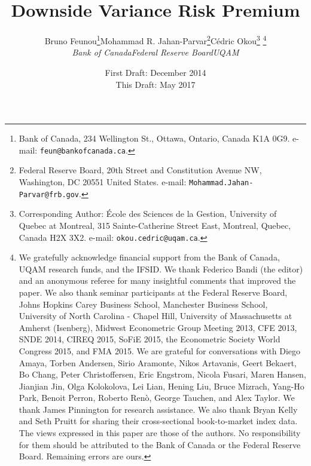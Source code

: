 \documentclass[11pt]{article}
\begin{document}
\title{Downside Variance Risk Premium}
\author{\begin{tabular}{ccc}
  Bruno Feunou\thanks{Bank of Canada, 234 Wellington St., Ottawa, Ontario, Canada K1A 0G9. e-mail:
\textcolor[rgb]{0.00,0.00,0.51}{\texttt{feun@bankofcanada.ca}}.} & Mohammad R. Jahan-Parvar\thanks{Federal Reserve Board, 20th Street and Constitution Avenue NW, Washington, DC 20551 United States. e-mail: \textcolor[rgb]{0.00,0.00,0.51}{\texttt{Mohammad.Jahan-Parvar@frb.gov}}.}& C\'{e}dric Okou\thanks{Corresponding Author: \'{E}cole des Sciences de la Gestion, University of Quebec at Montreal, 315 Sainte-Catherine Street East, Montreal, Quebec, Canada H2X 3X2. e-mail: \textcolor[rgb]{0.00,0.00,0.51}{\texttt{okou.cedric@uqam.ca}}.} \thanks{We gratefully acknowledge financial support from the Bank of Canada, UQAM research funds, and the
IFSID. We thank Federico Bandi (the editor) and an anonymous referee for many insightful comments that improved the paper. We also thank seminar participants at the Federal Reserve Board, Johns Hopkins Carey Business School, Manchester Business School, University of North Carolina - Chapel Hill, University of Massachusetts at Amherst (Isenberg), Midwest Econometric Group Meeting 2013, CFE 2013, SNDE 2014, CIREQ 2015, SoFiE 2015, the Econometric Society World Congress 2015, and FMA 2015. We are grateful for conversations with Diego Amaya, Torben Andersen, Sirio Aramonte, Nikos Artavanis, Geert Bekaert, Bo Chang, Peter Christoffersen, Eric Engstrom, Nicola Fusari, Maren Hansen, Jianjian Jin, Olga Kolokolova, Lei Lian, Hening Liu, Bruce Mizrach, Yang-Ho Park, Benoit Perron, Roberto Ren\`{o}, George Tauchen, and Alex Taylor. We thank James Pinnington for research assistance. We also thank Bryan Kelly and Seth Pruitt for sharing their cross-sectional book-to-market index data. The views expressed in this paper are those of the authors. No responsibility for them should be attributed to the Bank of Canada or the Federal Reserve Board. Remaining errors are ours.}  \\
  \textit{Bank of Canada} & \textit{Federal Reserve Board}& \textit{UQAM}\\
\end{tabular}}
\date{First Draft: December 2014\\This Draft: May 2017}
\end{document}
